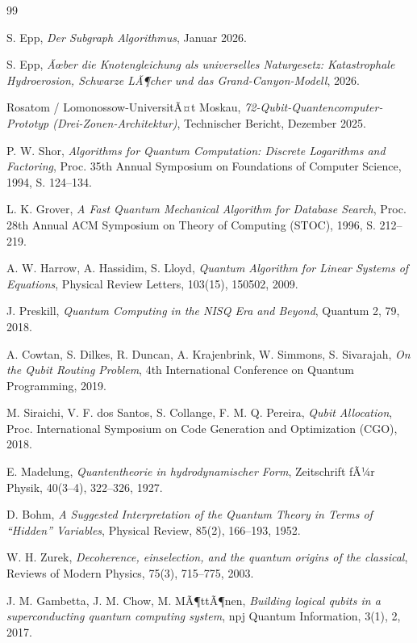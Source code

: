 ﻿\documentclass[a4paper,12pt]{article}
\theoremstyle{definition}
\begin{document}
\begin{thebibliography}{99}

S. Epp,
\textit{Der Subgraph Algorithmus}, Januar 2026.

S. Epp,
\textit{Ãœber die Knotengleichung als universelles Naturgesetz: Katastrophale
Hydroerosion, Schwarze LÃ¶cher und das Grand-Canyon-Modell}, 2026.

Rosatom / Lomonossow-UniversitÃ¤t Moskau,
\textit{72-Qubit-Quantencomputer-Prototyp (Drei-Zonen-Architektur)},
Technischer Bericht, Dezember 2025.

P. W. Shor,
\textit{Algorithms for Quantum Computation: Discrete Logarithms and Factoring},
Proc. 35th Annual Symposium on Foundations of Computer Science, 1994, S. 124--134.

L. K. Grover,
\textit{A Fast Quantum Mechanical Algorithm for Database Search},
Proc. 28th Annual ACM Symposium on Theory of Computing (STOC), 1996, S. 212--219.

A. W. Harrow, A. Hassidim, S. Lloyd,
\textit{Quantum Algorithm for Linear Systems of Equations},
Physical Review Letters, 103(15), 150502, 2009.

J. Preskill,
\textit{Quantum Computing in the NISQ Era and Beyond},
Quantum 2, 79, 2018.

A. Cowtan, S. Dilkes, R. Duncan, A. Krajenbrink, W. Simmons, S. Sivarajah,
\textit{On the Qubit Routing Problem},
4th International Conference on Quantum Programming, 2019.

M. Siraichi, V. F. dos Santos, S. Collange, F. M. Q. Pereira,
\textit{Qubit Allocation},
Proc. International Symposium on Code Generation and Optimization (CGO), 2018.

E. Madelung,
\textit{Quantentheorie in hydrodynamischer Form},
Zeitschrift fÃ¼r Physik, 40(3--4), 322--326, 1927.

D. Bohm,
\textit{A Suggested Interpretation of the Quantum Theory in Terms of ``Hidden''
Variables},
Physical Review, 85(2), 166--193, 1952.

W. H. Zurek,
\textit{Decoherence, einselection, and the quantum origins of the classical},
Reviews of Modern Physics, 75(3), 715--775, 2003.

J. M. Gambetta, J. M. Chow, M. MÃ¶ttÃ¶nen,
\textit{Building logical qubits in a superconducting quantum computing system},
npj Quantum Information, 3(1), 2, 2017.


\end{thebibliography}
\end{document}
